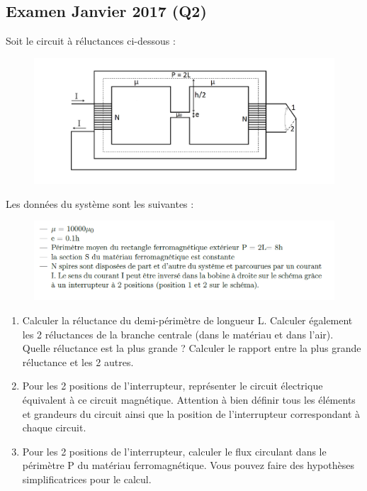 \newpage
\subsection{Examen Janvier 2017 (Q2)}

Soit le circuit à réluctances ci-dessous :
\begin{figure}[h!]
    \centering
    \includegraphics[width = 14cm]{TpQEx_Champs/Q2_TheoChampsJanv2017.PNG}
    \label{fig:Q2_TheoChampsJanv2017}
\end{figure}
Les données du système sont les suivantes :
\begin{figure}[h!]
    \centering
    \includegraphics[width = 13cm]{TpQEx_Champs/Q2_Hint_TheoChampsJanv2017.PNG}
    \label{fig:Q2_Hint_TheoChampsJanv2017}
\end{figure}

\begin{enumerate}
    \item Calculer la réluctance du demi-périmètre de longueur L. Calculer également les 2 réluctances de la branche centrale (dans le matériau et dans
    l’air). Quelle réluctance est la plus grande ? Calculer le rapport entre la plus grande réluctance et les 2 autres.
    \item Pour les 2 positions de l’interrupteur, représenter le circuit électrique équivalent à ce circuit magnétique. Attention à bien définir tous
    les éléments et grandeurs du circuit ainsi que la position de l’interrupteur correspondant à chaque circuit.
    \item Pour les 2 positions de l’interrupteur, calculer le flux circulant dans le périmètre P du matériau ferromagnétique. Vous pouvez faire des hypothèses simplificatrices pour le calcul.
\end{enumerate}
